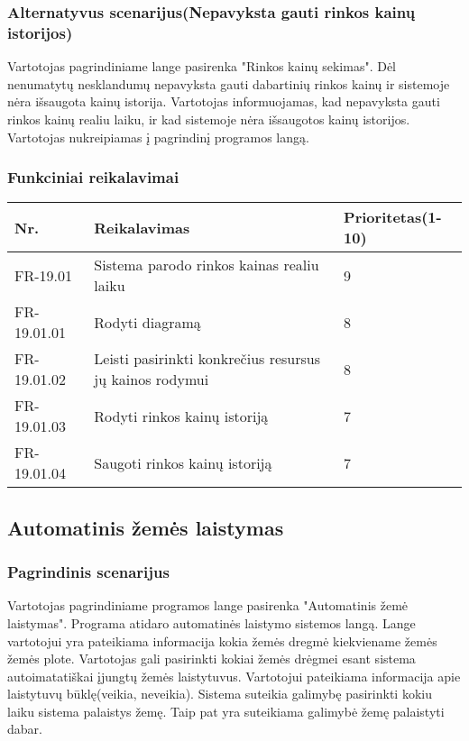 \documentclass[oneside]{VUMIFPSkursinis}
\begin{document}
	\subsubsection{Alternatyvus scenarijus(Nepavyksta gauti rinkos kainų istorijos)}
	Vartotojas pagrindiniame lange pasirenka "Rinkos kainų sekimas". Dėl nenumatytų nesklandumų nepavyksta gauti dabartinių rinkos kainų ir sistemoje nėra išsaugota kainų istorija. Vartotojas informuojamas, kad nepavyksta gauti rinkos kainų realiu laiku, ir kad sistemoje nėra išsaugotos kainų istorijos. Vartotojas nukreipiamas į pagrindinį programos langą.
	\subsubsection{Funkciniai reikalavimai}
\begin{table}[htbp]
	\begin{tabularx}{1\textwidth}{ |P{2.5cm}|X|P{3cm }| } \hline
		Nr. & Reikalavimas & Prioritetas(1-10) \\ \hline
		FR-19.01 & Sistema parodo rinkos kainas realiu laiku &  9 \\ \hline
		FR-19.01.01 & Rodyti diagramą & 8 \\ \hline
		FR-19.01.02 & Leisti pasirinkti konkrečius resursus jų kainos rodymui & 8 \\ \hline
		FR-19.01.03 & Rodyti rinkos kainų istoriją & 7 \\ \hline
		FR-19.01.04 & Saugoti rinkos kainų istoriją & 7 \\ \hline
	\end{tabularx}
\end{table}
	 
\subsection{Automatinis žemės laistymas}
	\subsubsection{Pagrindinis scenarijus}
	Vartotojas pagrindiniame programos lange pasirenka "Automatinis žemė laistymas". Programa atidaro automatinės laistymo sistemos langą. Lange vartotojui yra pateikiama informacija kokia žemės dregmė kiekviename žemės žemės plote. Vartotojas gali pasirinkti kokiai žemės drėgmei esant sistema autoimatatiškai įjungtų žemės laistytuvus. Vartotojui pateikiama informacija apie laistytuvų būklę(veikia, neveikia). Sistema suteikia galimybę pasirinkti kokiu laiku sistema palaistys žemę. Taip pat yra suteikiama galimybė žemę palaistyti dabar.
\end{document}

